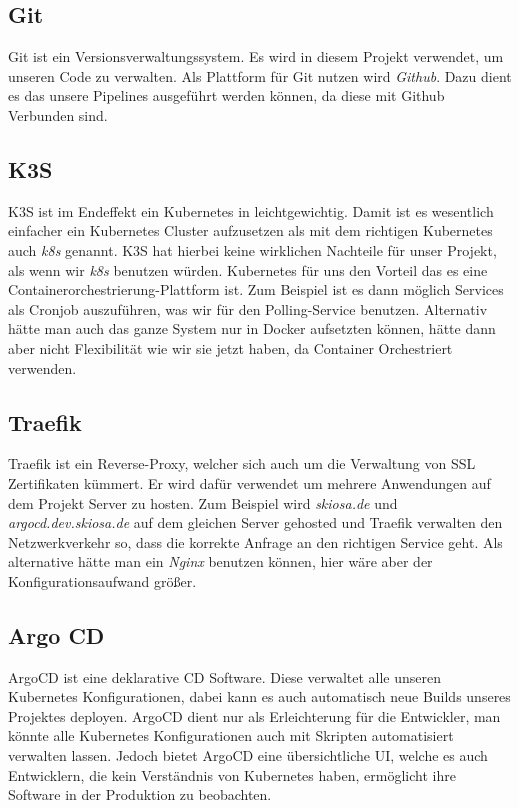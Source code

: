 \subsection{Git}
    Git ist ein Versionsverwaltungssystem. Es wird in diesem Projekt verwendet, um unseren Code zu verwalten. Als Plattform für Git nutzen wird \textit{Github}.
    Dazu dient es das unsere Pipelines ausgeführt werden können, da diese mit Github Verbunden sind.
\subsection{K3S}
    K3S ist im Endeffekt ein Kubernetes in leichtgewichtig. Damit ist es wesentlich einfacher ein Kubernetes Cluster aufzusetzen als mit dem richtigen Kubernetes auch \textit{k8s} genannt.
    K3S hat hierbei keine wirklichen Nachteile für unser Projekt, als wenn wir \textit{k8s} benutzen würden. Kubernetes für uns den Vorteil das es eine Containerorchestrierung-Plattform ist.
    Zum Beispiel ist es dann möglich Services als Cronjob auszuführen, was wir für den Polling-Service benutzen. Alternativ hätte man auch das ganze System nur in Docker aufsetzten können, hätte dann aber 
    nicht Flexibilität wie wir sie jetzt haben, da Container Orchestriert verwenden.
\subsection{Traefik}
    Traefik ist ein Reverse-Proxy, welcher sich auch um die Verwaltung von \ac{SSL} Zertifikaten kümmert. Er wird dafür verwendet um mehrere Anwendungen auf dem Projekt Server zu hosten.
    Zum Beispiel wird \textit{skiosa.de} und \textit{argocd.dev.skiosa.de} auf dem gleichen Server gehosted und Traefik verwalten den Netzwerkverkehr so, dass die korrekte Anfrage an den richtigen Service geht.
    Als alternative hätte man ein \textit{Nginx} benutzen können, hier wäre aber der Konfigurationsaufwand größer.
\subsection{Argo CD}
    ArgoCD ist eine deklarative \ac{CD} Software. Diese verwaltet alle unseren Kubernetes Konfigurationen, dabei kann es auch automatisch neue Builds unseres Projektes deployen.
    ArgoCD dient nur als Erleichterung für die Entwickler, man könnte alle Kubernetes Konfigurationen auch mit Skripten automatisiert verwalten lassen. Jedoch bietet ArgoCD eine übersichtliche UI,
    welche es auch Entwicklern, die kein Verständnis von Kubernetes haben, ermöglicht ihre Software in der Produktion zu beobachten.
